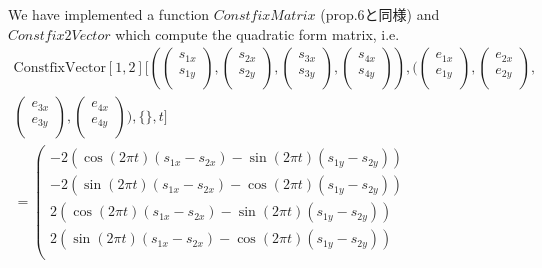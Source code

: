 \documentclass[8pt]{article}
\begin{document}
\begin{screen}
We have implemented a function $ConstfixMatrix$ (prop.6と同様) and $Constfix2Vector$ which compute the
 quadratic form matrix, i.e.
\begin{eqnarray*}
\text{ConstfixVector}[1,2][(\left(\begin{array}{c}
s_{1x}\\
s_{1y}\\
\end{array}\right),\left(\begin{array}{c}
s_{2x}\\
s_{2y}\\
\end{array}\right),\left(\begin{array}{c}
s_{3x}\\
s_{3y}\\
\end{array}\right),\left(\begin{array}{c}
s_{4x}\\
s_{4y}\\
\end{array}\right)),(\left(\begin{array}{c}
e_{1x}\\
e_{1y}\\
\end{array}\right),\left(\begin{array}{c}
e_{2x}\\
e_{2y}\\
\end{array}\right),\\
\left(\begin{array}{c}
e_{3x}\\
e_{3y}\\
\end{array}\right),\left(\begin{array}{c}
e_{4x}\\
e_{4y}\\
\end{array}\right)), \{\}, t] \\
= 
 \left(\begin{array}{c}
 -2(\cos(2\pi t)(s_{1x} - s_{2x}) - \sin(2\pi t)(s_{1y} - s_{2y}))\\
 -2(\sin(2\pi t)(s_{1x} - s_{2x}) - \cos(2\pi t)(s_{1y} - s_{2y}))\\
 2(\cos(2\pi t)(s_{1x} - s_{2x}) - \sin(2\pi t)(s_{1y} - s_{2y}))\\
 2(\sin(2\pi t)(s_{1x} - s_{2x}) - \cos(2\pi t)(s_{1y} - s_{2y}))\\

\end{array}
\end{eqnarray*}
\end{screen}
\end{document}
